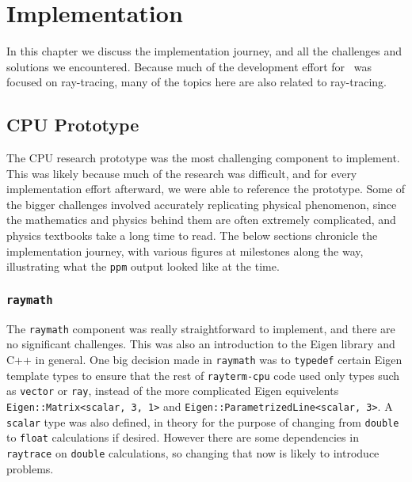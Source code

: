 %
%
%
\chapter{Implementation}\label{ch:implementation}

In this chapter we discuss the implementation journey, and all the challenges and solutions we encountered.
Because much of the development effort for \name\ was focused on ray-tracing, many of the topics here are also related to ray-tracing.

\section{CPU Prototype}\label{ch:implementation:prototype}

The CPU research prototype was the most challenging component to implement.
This was likely because much of the research was difficult, and for every implementation effort afterward, we were able to reference the prototype.
Some of the bigger challenges involved accurately replicating physical phenomenon, since the mathematics and physics behind them are often extremely complicated, and physics textbooks take a long time to read.
The below sections chronicle the implementation journey, with various figures at milestones along the way, illustrating what the \texttt{ppm} output looked like at the time.


\subsection{\texttt{raymath}}\label{ch:implementation:prototype:raymath}

The \texttt{raymath} component was really straightforward to implement, and there are no significant challenges.
This was also an introduction to the Eigen library \cite{eigenweb} and C++ in general.
One big decision made in \texttt{raymath} was to \texttt{typedef} certain Eigen template types to ensure that the rest of \texttt{rayterm-cpu} code used only types such as \texttt{vector} or \texttt{ray}, instead of the more complicated Eigen equivelents \texttt{Eigen::Matrix<scalar, 3, 1>} and \texttt{Eigen::ParametrizedLine<scalar, 3>}.
A \texttt{scalar} type was also defined, in theory for the purpose of changing from \texttt{double} to \texttt{float} calculations if desired.
However there are some dependencies in \texttt{raytrace} on \texttt{double} calculations, so changing that now is likely to introduce problems.

